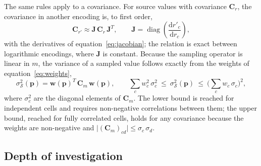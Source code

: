 \documentclass[manuscript]{geophysics}
\begin{document}
The same rules apply to a covariance. For source values with
covariance $\mathbf{C}_r$, the covariance in another encoding is, to
first order,
\begin{equation}
\mathbf{C}_{r'} \approx \mathbf{J}\,\mathbf{C}_r\,\mathbf{J}^{T},
\qquad
\mathbf{J} = \operatorname{diag}\!\left(
\frac{\mathrm{d}r'_c}{\mathrm{d}r_c}\right),
\label{eq:cov}
\end{equation}
with the derivatives of equation~\ref{eq:jacobian}; the relation is
exact between logarithmic encodings, where $\mathbf{J}$ is constant.
Because the sampling operator is linear in $m$, the variance of a
sampled value follows exactly from the weights of
equation~\ref{eq:weights},
\begin{equation}
\sigma_{\mathcal{S}}^{2}(\mathbf{p}) =
\mathbf{w}(\mathbf{p})^{T}\,\mathbf{C}_m\,\mathbf{w}(\mathbf{p}),
\qquad
\sum_c w_c^{2}\,\sigma_c^{2}
\ \le\ \sigma_{\mathcal{S}}^{2}(\mathbf{p})
\ \le\ \Big(\sum_c w_c\,\sigma_c\Big)^{2},
\label{eq:interp-var}
\end{equation}
where $\sigma_c^2$ are the diagonal elements of $\mathbf{C}_m$. The
lower bound is reached for independent cells and requires
non-negative correlations between them; the upper bound, reached for
fully correlated cells, holds for any covariance because the weights
are non-negative and
$\lvert (\mathbf{C}_m)_{cd} \rvert \le \sigma_c\,\sigma_d$.


\subsection{Depth of investigation}
\end{document}
